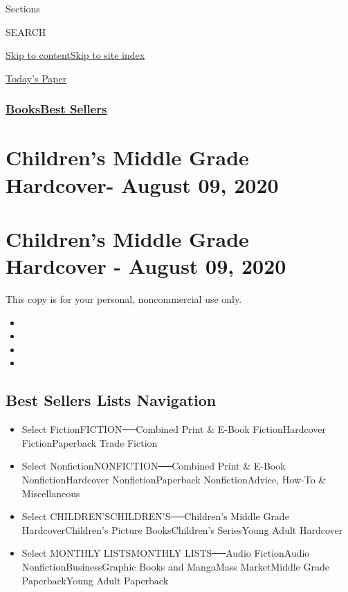 Sections

SEARCH

\protect\hyperlink{site-content}{Skip to
content}\protect\hyperlink{site-index}{Skip to site index}

\href{https://myaccount.nytimes3xbfgragh.onion/auth/login?response_type=cookie\&client_id=vi}{}

\href{https://www.nytimes3xbfgragh.onion/section/todayspaper}{Today's
Paper}

\hypertarget{booksbest-sellers}{%
\subsubsection{\texorpdfstring{\href{/section/books/}{Books}\textbar{}\href{/books/best-sellers/}{Best
Sellers}}{Books\textbar{}Best Sellers}}\label{booksbest-sellers}}

\hypertarget{childrens-middle-grade-hardcover--august-09-2020}{%
\section{Children's Middle Grade Hardcover- August 09,
2020}\label{childrens-middle-grade-hardcover--august-09-2020}}

\hypertarget{childrens-middle-grade-hardcover---august-09-2020}{%
\section{Children's Middle Grade Hardcover - August 09,
2020}\label{childrens-middle-grade-hardcover---august-09-2020}}

This copy is for your personal, noncommercial use only.

\begin{itemize}
\item
\item
\item
\item
\end{itemize}

\hypertarget{best-sellers-lists-navigation}{%
\subsection{Best Sellers Lists
Navigation}\label{best-sellers-lists-navigation}}

\begin{itemize}
\tightlist
\item
  Select FictionFICTION──Combined Print \& E-Book FictionHardcover
  FictionPaperback Trade Fiction
\item
  Select NonfictionNONFICTION──Combined Print \& E-Book
  NonfictionHardcover NonfictionPaperback NonfictionAdvice, How-To \&
  Miscellaneous
\item
  Select CHILDREN'SCHILDREN'S──Children's Middle Grade
  HardcoverChildren's Picture BooksChildren's SeriesYoung Adult
  Hardcover
\item
  Select MONTHLY LISTSMONTHLY LISTS──Audio FictionAudio
  NonfictionBusinessGraphic Books and MangaMass MarketMiddle Grade
  PaperbackYoung Adult Paperback
\end{itemize}

